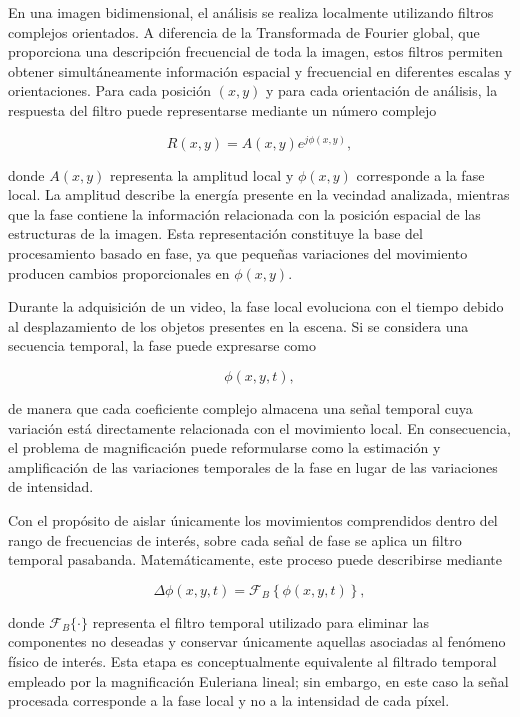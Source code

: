 En una imagen bidimensional, el análisis se realiza localmente utilizando filtros complejos orientados. A diferencia de la Transformada de Fourier global, que proporciona una descripción frecuencial de toda la imagen, estos filtros permiten obtener simultáneamente información espacial y frecuencial en diferentes escalas y orientaciones. Para cada posición $(x,y)$ y para cada orientación de análisis, la respuesta del filtro puede representarse mediante un número complejo

\begin{equation}
R(x,y)
=
A(x,y)e^{j\phi(x,y)},
\label{eq:complex}
\end{equation}

donde $A(x,y)$ representa la amplitud local y $\phi(x,y)$ corresponde a la fase local. La amplitud describe la energía presente en la vecindad analizada, mientras que la fase contiene la información relacionada con la posición espacial de las estructuras de la imagen. Esta representación constituye la base del procesamiento basado en fase, ya que pequeñas variaciones del movimiento producen cambios proporcionales en $\phi(x,y)$.

Durante la adquisición de un video, la fase local evoluciona con el tiempo debido al desplazamiento de los objetos presentes en la escena. Si se considera una secuencia temporal, la fase puede expresarse como

\begin{equation}
\phi(x,y,t),
\end{equation}

de manera que cada coeficiente complejo almacena una señal temporal cuya variación está directamente relacionada con el movimiento local. En consecuencia, el problema de magnificación puede reformularse como la estimación y amplificación de las variaciones temporales de la fase en lugar de las variaciones de intensidad.

Con el propósito de aislar únicamente los movimientos comprendidos dentro del rango de frecuencias de interés, sobre cada señal de fase se aplica un filtro temporal pasabanda. Matemáticamente, este proceso puede describirse mediante

\begin{equation}
\Delta\phi(x,y,t)
=
\mathcal{F}_B
\left\{
\phi(x,y,t)
\right\},
\label{eq:phase_filter}
\end{equation}

donde $\mathcal{F}_B\{\cdot\}$ representa el filtro temporal utilizado para eliminar las componentes no deseadas y conservar únicamente aquellas asociadas al fenómeno físico de interés. Esta etapa es conceptualmente equivalente al filtrado temporal empleado por la magnificación Euleriana lineal; sin embargo, en este caso la señal procesada corresponde a la fase local y no a la intensidad de cada píxel.

